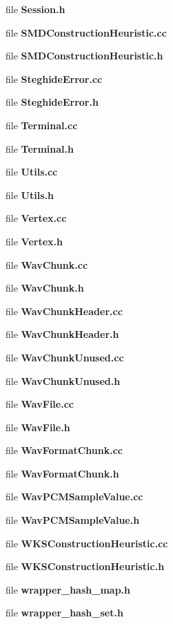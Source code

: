 \begin{DoxyCompactItemize}
\item 
file \textbf{ Session.\+h}
\item 
file \textbf{ S\+M\+D\+Construction\+Heuristic.\+cc}
\item 
file \textbf{ S\+M\+D\+Construction\+Heuristic.\+h}
\item 
file \textbf{ Steghide\+Error.\+cc}
\item 
file \textbf{ Steghide\+Error.\+h}
\item 
file \textbf{ Terminal.\+cc}
\item 
file \textbf{ Terminal.\+h}
\item 
file \textbf{ Utils.\+cc}
\item 
file \textbf{ Utils.\+h}
\item 
file \textbf{ Vertex.\+cc}
\item 
file \textbf{ Vertex.\+h}
\item 
file \textbf{ Wav\+Chunk.\+cc}
\item 
file \textbf{ Wav\+Chunk.\+h}
\item 
file \textbf{ Wav\+Chunk\+Header.\+cc}
\item 
file \textbf{ Wav\+Chunk\+Header.\+h}
\item 
file \textbf{ Wav\+Chunk\+Unused.\+cc}
\item 
file \textbf{ Wav\+Chunk\+Unused.\+h}
\item 
file \textbf{ Wav\+File.\+cc}
\item 
file \textbf{ Wav\+File.\+h}
\item 
file \textbf{ Wav\+Format\+Chunk.\+cc}
\item 
file \textbf{ Wav\+Format\+Chunk.\+h}
\item 
file \textbf{ Wav\+P\+C\+M\+Sample\+Value.\+cc}
\item 
file \textbf{ Wav\+P\+C\+M\+Sample\+Value.\+h}
\item 
file \textbf{ W\+K\+S\+Construction\+Heuristic.\+cc}
\item 
file \textbf{ W\+K\+S\+Construction\+Heuristic.\+h}
\item 
file \textbf{ wrapper\+\_\+hash\+\_\+map.\+h}
\item 
file \textbf{ wrapper\+\_\+hash\+\_\+set.\+h}
\end{DoxyCompactItemize}
